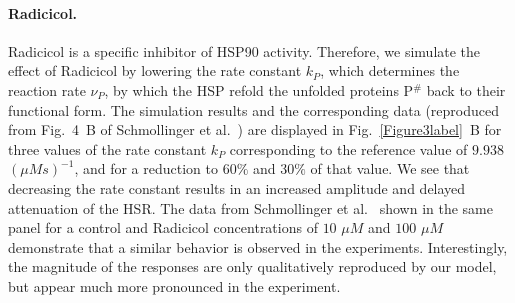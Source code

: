 \documentclass[oneside, 10pt, a4paper, twocolumn]{article}
\begin{document}





\paragraph{Radicicol.}

Radicicol is a specific inhibitor of HSP90 activity.
Therefore, we simulate the effect of Radicicol by lowering the rate constant $k_P$,
which determines the reaction rate $\nu_P$, by which the HSP refold the unfolded proteins P$^\#$ back to their functional form. 
The simulation results and the corresponding data (reproduced from Fig.~4~B of Schmollinger et al.~\cite{Schmollinger2013}) are
displayed in Fig.~\ref{Figure3label}~B for three values of the rate constant $k_P$ corresponding to the reference value of $9.938$ $\left(\mu M s\right)^{-1}$,
and for a reduction to $60\%$ and $30\%$ of that value. 
We see that decreasing the rate constant results {in an} increased amplitude and delayed attenuation of the HSR.
The data from Schmollinger et al.~\cite{Schmollinger2013} shown in the same panel for a control and Radicicol concentrations of $10$ $\mu M$ and $100$ $\mu M$
demonstrate that a similar behavior is observed in the experiments.
Interestingly, the magnitude of the responses are only qualitatively reproduced by our model, but
appear much more pronounced in the experiment. 
\end{document}
